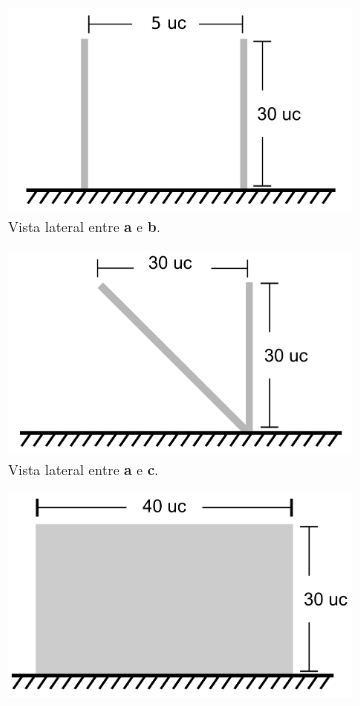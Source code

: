 \begin{figure}[H]
    \centering
    \begin{subfigure}[t]{0.328\textwidth}
        \includegraphics[width=\textwidth]{dados/figuras/dim_lateral_ab.png}
        \caption{Vista lateral entre \textbf{a} e \textbf{b}.}
        \label{fig:dim_lateral_ab}
    \end{subfigure}
    \begin{subfigure}[t]{0.328\textwidth}
        \includegraphics[width=\textwidth]{dados/figuras/dim_lateral_ac.png}
        \caption{Vista lateral entre \textbf{a} e \textbf{c}.}
        \label{fig:dim_lateral_ac}
    \end{subfigure}
    \begin{subfigure}[t]{0.328\textwidth}
        \includegraphics[width=\textwidth]{dados/figuras/dim_frontal.png}

\end{subfigure}
\end{figure}
